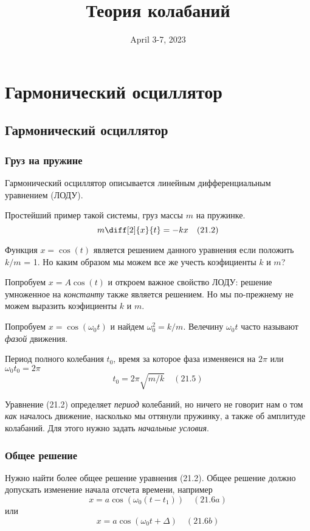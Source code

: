 \documentclass[12pt]{article}
\date{April 3-7, 2023}
\title{Теория колабаний}
\begin{document}
\maketitle

\tableofcontents

\section{Гармонический осциллятор}

\subsection{Гармонический осциллятор}

\subsubsection{Груз на пружине}

Гармонический осциллятор описывается линейным дифференциальным уравнением (ЛОДУ).

Простейший пример такой системы, груз массы $m$ на пружинке.
\[
m\diff[2]{x}{t}=-kx \quad (21.2)
\]

Функция $x=\cos(t)$ является решением данного уравнения если положить $k/m$ = 1.
Но каким образом мы можем все же учесть коэфициенты $k$ и $m$?

Попробуем $x=A\cos(t)$ и откроем важное свойство ЛОДУ: решение умноженное на \textit{константу} также является решением. Но мы по-прежнему не можем выразить коэфициенты $k$ и $m$.

Попробуем $x=\cos(\omega_0 t)$ и найдем $\omega_0^2=k/m$. Велечину $\omega_0 t$ часто называют \textit{фазой} движения.

Период полного колебания $t_0$, время за которое фаза изменяеися на $2\pi$ или $\omega_0t_0=2\pi$
\[
    t_0=2\pi\sqrt{m/k} \quad (21.5)
\]

Уравнение (21.2) определяет \textit{период} колебаний, но ничего не говорит нам о том \textit{как} началось движение, насколько мы оттянули пружинку, а также об амплитуде колабаний. Для этого нужно задать \textit{начальные условия}.

\subsubsection{Общее решение}

Нужно найти более общее решение уравнения (21.2). Общее решение должно допускать изменение начала отсчета времени, например
\[
    x=a\cos(\omega_0(t-t_1)) \quad (21.6a)
\]
или
\[
    x=a\cos(\omega_0t+\Delta) \quad (21.6b)
\]
\end{document}
